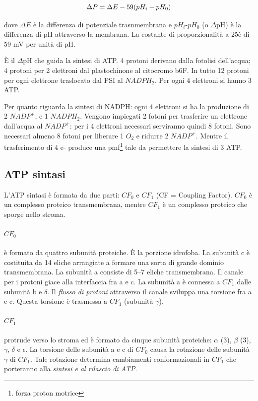 \documentclass[a4paper,12pt]{book}
\begin{document}
\begin{equation}
\centering
\Delta P= \Delta E - 59 (pH_{i}-pH_{0})
\end{equation}

dove $\Delta E$ è la differenza di potenziale trasnmembrana e $pH_{i}$-$pH_{0}$ (o $\Delta$pH) è la differenza di pH attraverso la membrana. La costante di proporzionalità a 25\textcelsius è di 59 mV per unità di pH.

È il $\Delta$pH che guida la sintesi di ATP. 4 protoni derivano dalla fotolisi dell'acqua; 4 protoni per 2 elettroni dal plastochinone al citocromo b6F. In tutto 12 protoni per ogni elettrone traslocato dal PSI al $NADPH_{2}$. Per ogni 4 elettroni si hanno 3 ATP.

Per quanto riguarda la sintesi di NADPH: ogni 4 elettroni si ha la produzione di 2 $NADP^{+}$, e 1 $NADPH_{2}$. Vengono impiegati 2 fotoni per trasferire un elettrone dall'acqua al $NADP^{+}$: per i 4 elettroni necessari serviranno quindi 8 fotoni. Sono necessari almeno 8 fotoni per liberare 1 $O_{2}$ e ridurre 2 $NADP^{+}$. Mentre il
trasferimento di 4 e- produce una pmf\footnote{forza proton motrice} tale da permettere la sintesi di 3 ATP.

\subsection{ATP sintasi}
L’ATP sintasi è formata da due parti: $CF_{0}$ e $CF_{1}$ (CF = Coupling Factor). $CF_{0}$ è un complesso proteico
transmembrana, mentre $CF_{1}$ è un complesso proteico che
sporge nello stroma.

\paragraph{$CF_{0}$}
è formato da quattro subunità proteiche. È la porzione idrofoba. La subunità
c è costituita da 14 eliche arrangiate a formare una sorta
di grande dominio transmembrana. La subunità a consiste
di 5–7 eliche transmembrana. Il canale per i protoni giace
alla interfaccia fra a e c. La subunità a è connessa a $CF_{1}$
dalle subunità b e $\delta$.
Il \emph{flusso di protoni} attraverso il canale sviluppa una
torsione fra a e c. Questa torsione è trasmessa a $CF_{1}$
(subunità $\gamma$).

\paragraph{$CF_{1}$} protrude verso lo stroma ed è formato da cinque subunità proteiche: $\alpha$ (3), $\beta$
(3), $\gamma$, $\delta$ e $\epsilon$. La torsione delle subunità a e c di  $CF_{0}$ causa
la rotazione delle subunità $\gamma$ di $CF_{1}$. Tale rotazione
determina cambiamenti conformazionali in $CF_{1}$ che
porteranno alla \emph{sintesi e al rilascio di ATP}.
\end{document}
